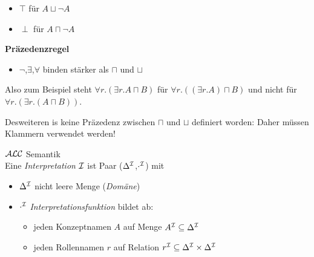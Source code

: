 \begin{itemize}
	\item{$\top$ für $A \sqcup \neg A$}
	\item{$\perp$ für $A \sqcap \neg A$}
\end{itemize}

\textbf{Präzedenzregel}

\begin{itemize}
	\item{$\neg$,$\exists$,$\forall$ binden stärker als $\sqcap$ und $\sqcup$}
\end{itemize}

Also zum Beispiel steht $\forall r.(\exists r.A \sqcap B)$ für $\forall r.((\exists r.A) \sqcap B)$ und nicht für $\forall r.(\exists r.(A \sqcap B))$.

Desweiteren is keine Präzedenz zwischen $\sqcap$ und $\sqcup$ definiert worden: Daher müssen Klammern verwendet werden!

\begin{definition}{$\mathcal{A}\mathcal{L}\mathcal{C}$ Semantik} \\
Eine \emph{Interpretation} $\mathcal{I}$ ist Paar ($\Delta^{\mathcal{I}}$,$\cdot^{\mathcal{I}}$) mit
	\begin{itemize}
		\item{$\Delta^{\mathcal{I}}$ nicht leere Menge (\emph{Domäne})}
		\item{$\cdot^{\mathcal{I}}$ \emph{Interpretationsfunktion} bildet ab:
		 \begin{itemize}
			 \item{jeden Konzeptnamen $A$ auf Menge $A^{\mathcal{I}} \subseteq \Delta^{\mathcal{I}}$}
			 \item{jeden Rollennamen $r$ auf Relation $r^{\mathcal{I}} \subseteq \Delta^{\mathcal{I}} \times \Delta^{\mathcal{I}}$}
		 \end{itemize}}
	\end{itemize}
\end{definition}
